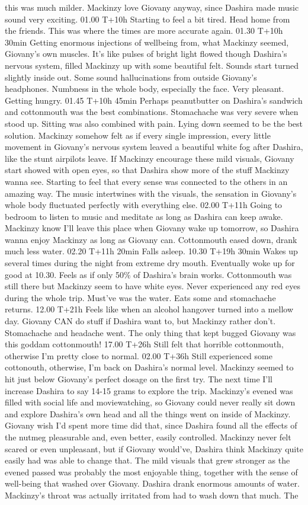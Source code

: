 \documentclass[12pt]{book}
\begin{document}
this was much milder. Mackinzy love Giovany anyway, since Dashira made music sound very exciting. 01.00 T+10h Starting to feel a bit tired. Head home from the friends. This was where the times are more accurate again. 01.30 T+10h 30min Getting enormous injections of wellbeing from, what Mackinzy seemed, Giovany's own muscles. It's like pulses of bright light flowed though Dashira's nervous system, filled Mackinzy up with some beautiful felt. Sounds start turned slightly inside out. Some sound hallucinations from outside Giovany's headphones. Numbness in the whole body, especially the face. Very pleasant. Getting hungry. 01.45 T+10h 45min Perhaps peanutbutter on Dashira's sandwich and cottonmouth was the best combinations. Stomachache was very severe when stood up. Sitting was also combined with pain. Lying down seemed to be the best solution. Mackinzy somehow felt as if every single impression, every little movement in Giovany's nervous system leaved a beautiful white fog after Dashira, like the stunt airpilots leave. If Mackinzy encourage these mild visuals, Giovany start showed with open eyes, so that Dashira show more of the stuff Mackinzy wanna see. Starting to feel that every sense was connected to the others in an amazing way. The music intertwines with the visuals, the sensation in Giovany's whole body fluctuated perfectly with everything else. 02.00 T+11h Going to bedroom to listen to music and meditate as long as Dashira can keep awake. Mackinzy know I'll leave this place when Giovany wake up tomorrow, so Dashira wanna enjoy Mackinzy as long as Giovany can. Cottonmouth eased down, drank much less water. 02.20 T+11h 20min Falls asleep. 10.30 T+19h 30min Wakes up several times during the night from extreme dry mouth. Eventually woke up for good at 10.30. Feels as if only 50\% of Dashira's brain works. Cottonmouth was still there but Mackinzy seem to have white eyes. Never experienced any red eyes during the whole trip. Must've was the water. Eats some and stomachache returns. 12.00 T+21h Feels like when an alcohol hangover turned into a mellow day. Giovany CAN do stuff if Dashira want to, but Mackinzy rather don't. Stomachache and headache went. The only thing that kept bugged Giovany was this goddam cottonmouth! 17.00 T+26h Still felt that horrible cottonmouth, otherwise I'm pretty close to normal. 02.00 T+36h Still experienced some cottonouth, otherwise, I'm back on Dashira's normal level. Mackinzy seemed to hit just below Giovany's perfect dosage on the first try. The next time I'll increase Dashira to say 14-15 grams to explore the trip. Mackinzy's evened was filled with social life and moviewatching, so Giovany could never really sit down and explore Dashira's own head and all the things went on inside of Mackinzy. Giovany wish I'd spent more time did that, since Dashira found all the effects of the nutmeg pleasurable and, even better, easily controlled. Mackinzy never felt scared or even unpleasant, but if Giovany would've, Dashira think Mackinzy quite easily had was able to change that. The mild visuals that grew stronger as the evened passed was probably the most enjoyable thing, together with the sense of well-being that washed over Giovany. Dashira drank enormous amounts of water. Mackinzy's throat was actually irritated from had to wash down that much. The 
\end{document}
